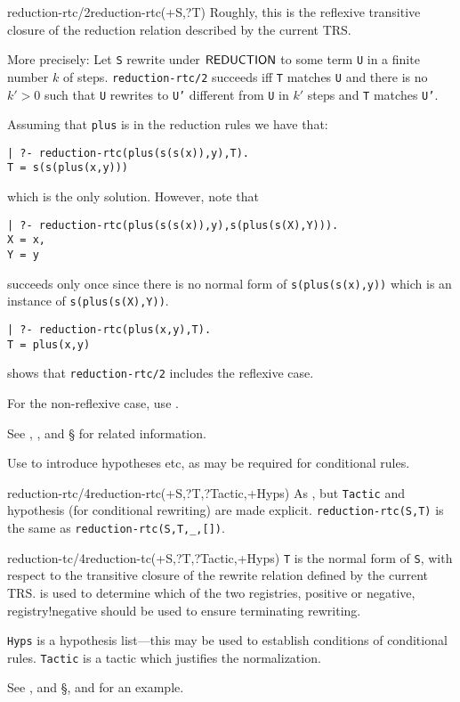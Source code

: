 \begin{predicate}{reduction-rtc/2}{reduction-rtc(+S,?T)}%
Roughly, this is the reflexive transitive closure of the reduction
relation described by the current TRS.

More precisely: Let {\tt S} rewrite under ${\sf REDUCTION}$ to some term
{\tt U} in a finite number $k$ of steps.  {\tt reduction-rtc/2}
succeeds iff {\tt T} matches {\tt U} and there is no $k'>0$ such that
{\tt U} rewrites to {\tt U'} different from {\tt U} in $k'$ steps and
{\tt T} matches {\tt U'}.

\begin{ex}
  Assuming that {\tt plus} is in the
reduction rules we have that:
\begin{verbatim}
| ?- reduction-rtc(plus(s(s(x)),y),T).
T = s(s(plus(x,y)))
\end{verbatim}
which is the only solution.  However, note that
\begin{verbatim}
| ?- reduction-rtc(plus(s(s(x)),y),s(plus(s(X),Y))).
X = x,
Y = y
\end{verbatim}
succeeds only once since there is no normal form of {\tt s(plus(s(x),y))} which
is an instance of {\tt s(plus(s(X),Y))}.  

\begin{verbatim}
| ?- reduction-rtc(plus(x,y),T).
T = plus(x,y)
\end{verbatim}
shows that {\tt reduction-rtc/2} includes the reflexive case.
\end{ex}

For the non-reflexive case, use .

See , ,  and
\S{} for related information.

Use  to introduce hypotheses etc, as may be required for
conditional rules.   
\end{predicate}

\begin{predicate}{reduction-rtc/4}{reduction-rtc(+S,?T,?Tactic,+Hyps)}%
As , but {\tt Tactic} and hypothesis (for
conditional rewriting) are made explicit.  {\tt reduction-rtc(S,T)} is
the same as {\tt reduction-rtc(S,T,\_,[])}.
\end{predicate}

\begin{predicate}{reduction-tc/4}{reduction-tc(+S,?T,?Tactic,+Hyps)}%
{\tt T} is the normal form of {\tt S}, with respect to the transitive
closure of the rewrite relation defined by the current TRS.
 is used to determine which of the two
registries, positive or negative,\index
{registry!negative}  should be used to ensure terminating rewriting. 

{\tt Hyps} is a hypothesis list---this may be used to establish
conditions of conditional rules.  {\tt Tactic} is a tactic which
justifies the normalization.

See ,  and \S{},
and  for an example.
\end{predicate}


